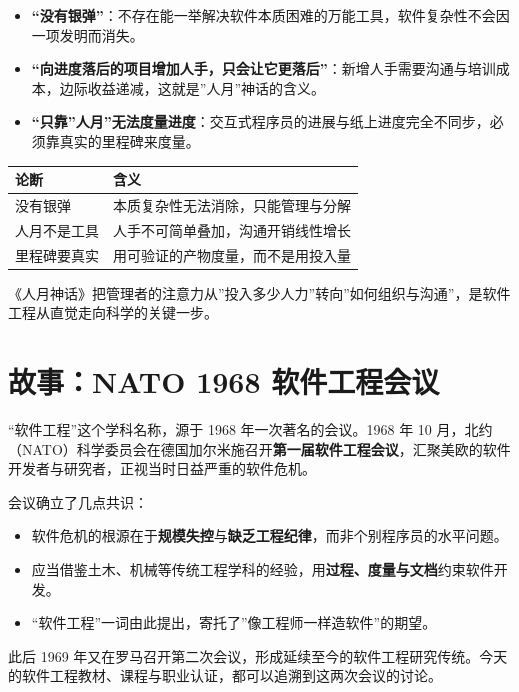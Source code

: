 \documentclass[
]{ctexbook}
\providecommand{\tightlist}{\setlength{\itemsep}{0pt}\setlength{\parskip}{0pt} }
\newcounter{none}
\begin{document}
\begin{itemize}
\tightlist
\item
  \textbf{``没有银弹''}：不存在能一举解决软件本质困难的万能工具，软件复杂性不会因一项发明而消失。
\item
  \textbf{``向进度落后的项目增加人手，只会让它更落后''}：新增人手需要沟通与培训成本，边际收益递减，这就是''人月''神话的含义。
\item
  \textbf{``只靠''人月''无法度量进度}：交互式程序员的进展与纸上进度完全不同步，必须靠真实的里程碑来度量。
\end{itemize}

{\def\LTcaptype{none} %
\begin{longtable}[]{@{}ll@{}}
\toprule\noalign{}
论断 & 含义 \\
\midrule\noalign{}
\endhead
\bottomrule\noalign{}
\endlastfoot
没有银弹 & 本质复杂性无法消除，只能管理与分解 \\
人月不是工具 & 人手不可简单叠加，沟通开销线性增长 \\
里程碑要真实 & 用可验证的产物度量，而不是用投入量 \\
\end{longtable}
}

《人月神话》把管理者的注意力从''投入多少人力''转向''如何组织与沟通''，是软件工程从直觉走向科学的关键一步。

\section{故事：NATO 1968
软件工程会议}\label{ux6545ux4e8bnato-1968-ux8f6fux4ef6ux5de5ux7a0bux4f1aux8bae}

``软件工程''这个学科名称，源于 1968 年一次著名的会议。1968 年 10
月，北约（NATO）科学委员会在德国加尔米施召开\textbf{第一届软件工程会议}，汇聚美欧的软件开发者与研究者，正视当时日益严重的软件危机。

会议确立了几点共识：

\begin{itemize}
\tightlist
\item
  软件危机的根源在于\textbf{规模失控}与\textbf{缺乏工程纪律}，而非个别程序员的水平问题。
\item
  应当借鉴土木、机械等传统工程学科的经验，用\textbf{过程、度量与文档}约束软件开发。
\item
  ``软件工程''一词由此提出，寄托了''像工程师一样造软件''的期望。
\end{itemize}

此后 1969
年又在罗马召开第二次会议，形成延续至今的软件工程研究传统。今天的软件工程教材、课程与职业认证，都可以追溯到这两次会议的讨论。
\end{document}
